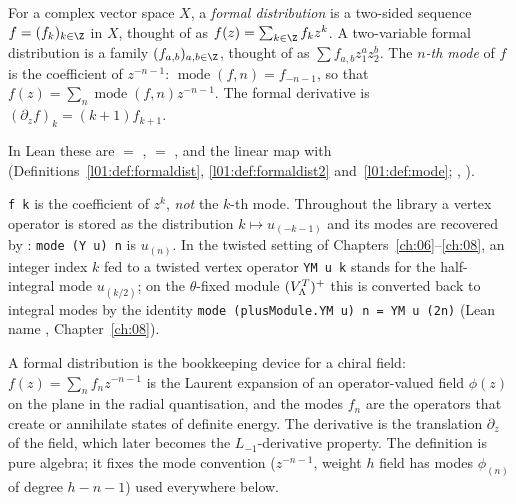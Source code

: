 \begin{definition}\label{ch09:def:fd}
For a complex vector space $X$, a \emph{formal distribution} is a two-sided sequence
$f=(f_k)_{k\in\Z}$ in $X$, thought of as $f(z)=\sum_{k\in\Z}f_k z^k$. A two-variable formal
distribution is a family $(f_{a,b})_{a,b\in\Z}$, thought of as $\sum f_{a,b}z_1^az_2^b$. The
\emph{$n$-th mode} of $f$ is the coefficient of $z^{-n-1}$:
$\operatorname{mode}(f,n)=f_{-n-1}$, so that $f(z)=\sum_n \operatorname{mode}(f,n)z^{-n-1}$. The
formal derivative is $(\partial_zf)_k=(k+1)f_{k+1}$.
\end{definition}

In Lean these are  $=$ ,  $=$
,  and the linear map  with
 (Definitions~\ref{l01:def:formaldist},
\ref{l01:def:formaldist2} and~\ref{l01:def:mode}; ,
).

\begin{dictionary}
\texttt{f k} is the coefficient of $z^k$, \emph{not} the $k$-th mode. Throughout the library
a vertex operator is stored as the distribution $k\mapsto u_{(-k-1)}$ and its modes are recovered
by : \texttt{mode (Y u) n} is $u_{(n)}$. In the twisted setting of
Chapters~\ref{ch:06}--\ref{ch:08}, an integer index $k$ fed to a twisted vertex operator
\texttt{YM u k} stands for the half-integral mode $u_{(k/2)}$; on the $\theta$-fixed module
$(V_{\Lambda}^{T})^{+}$ this is converted back to integral modes by the identity
\texttt{mode (plusModule.YM u) n = YM u (2n)} (Lean name , Chapter~\ref{ch:08}).
\end{dictionary}

\begin{physics}
A formal distribution is the bookkeeping device for a chiral field: $f(z)=\sum_n f_nz^{-n-1}$ is the Laurent expansion of an operator-valued field $\phi(z)$ on the plane in the radial quantisation, and the modes $f_n$ are the operators that create or annihilate states of definite energy. The derivative is the translation $\partial_z$ of the field, which later becomes the $L_{-1}$-derivative property. The definition is pure algebra; it fixes the mode convention ($z^{-n-1}$, weight $h$ field has modes $\phi_{(n)}$ of degree $h-n-1$) used everywhere below.
\end{physics}

